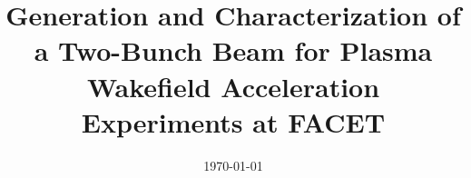 

\title{Generation and Characterization of a Two-Bunch Beam for Plasma Wakefield Acceleration Experiments at FACET}



\date{\today}




\maketitle
